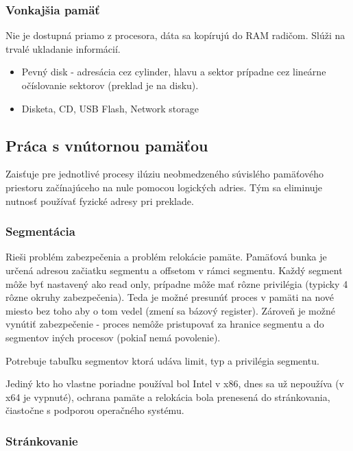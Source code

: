 \documentclass[a4paper,10pt]{article}
\begin{document}
\begin{multicols}{2}
		\subsubsection{Vonkajšia pamäť}
	
			Nie je dostupná priamo z procesora, dáta sa kopírujú do RAM radičom. Slúži na trvalé ukladanie informácií. 
		
			\begin{itemize}
				\item Pevný disk - adresácia cez cylinder, hlavu a sektor prípadne cez lineárne očíslovanie sektorov (preklad je na disku).
				\item Disketa, CD, USB Flash, Network storage
			\end{itemize}

	\subsection{Práca s vnútornou pamäťou}
	
		Zaisťuje pre jednotlivé procesy ilúziu neobmedzeného súvislého pamäťového priestoru začínajúceho na nule pomocou logických adries. Tým sa eliminuje nutnosť používať fyzické adresy pri preklade.
		
		\subsubsection{Segmentácia}
		
			Rieši problém zabezpečenia a problém relokácie pamäte. Pamäťová bunka je určená adresou začiatku segmentu a offsetom v rámci segmentu. Každý segment môže byť nastavený ako read only, prípadne môže mať rôzne privilégia (typicky 4 rôzne okruhy zabezpečenia). Teda je možné presunúť proces v pamäti na nové miesto bez toho aby o tom vedel (zmení sa bázový register). Zároveň je možné vynútiť zabezpečenie - proces nemôže pristupovať za hranice segmentu a do segmentov iných procesov (pokiaľ nemá povolenie).
			
			Potrebuje tabuľku segmentov ktorá udáva limit, typ a privilégia segmentu.
			
			Jediný kto ho vlastne poriadne používal bol Intel v x86, dnes sa už nepoužíva (v x64 je vypnuté), ochrana pamäte a relokácia bola prenesená do stránkovania, čiastočne s podporou operačného systému.

		\subsubsection{Stránkovanie}
		

\end{multicols}
\end{document}

